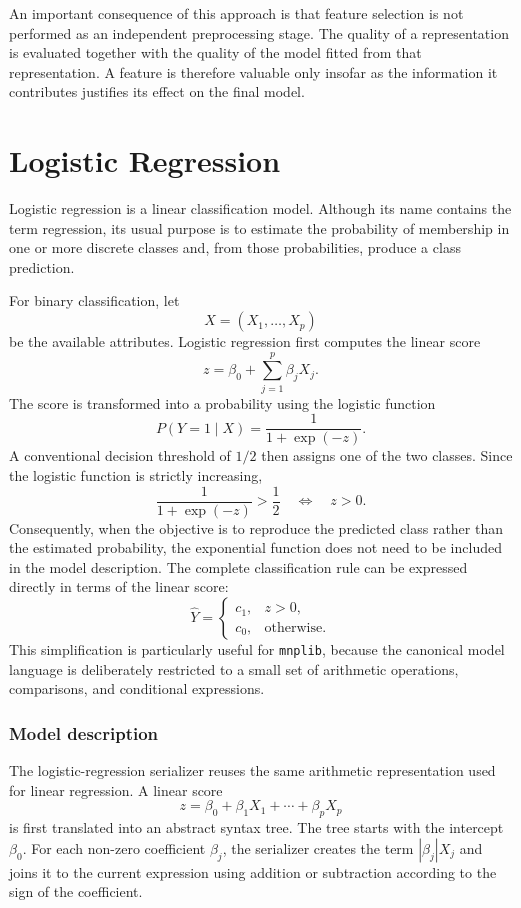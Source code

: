 An important consequence of this approach is that feature selection is not performed as an independent preprocessing stage. The quality of a representation is evaluated together with the quality of the model fitted from that representation. A feature is therefore valuable only insofar as the information it contributes justifies its effect on the final model.

%
%

\section{Logistic Regression}
\label{subsec:automl_logistic_regression}

Logistic regression is a linear classification model. Although its name contains the term regression, its usual purpose is to estimate the probability of membership in one or more discrete classes and, from those probabilities, produce a class prediction.

For binary classification, let
\[
X=(X_1,\ldots,X_p)
\]
be the available attributes. Logistic regression first computes the linear score
\[
z = \beta_0 + \sum_{j=1}^{p}\beta_j X_j.
\]
The score is transformed into a probability using the logistic function
\[
P(Y=1\mid X) = \frac{1}{1+\exp(-z)}.
\]
A conventional decision threshold of $1/2$ then assigns one of the two classes. Since the logistic function is strictly increasing,
\[
\frac{1}{1+\exp(-z)}>\frac{1}{2} \quad\Longleftrightarrow\quad z>0.
\]
Consequently, when the objective is to reproduce the predicted class rather than the estimated probability, the exponential function does not need to be included in the model description. The complete classification rule can be expressed directly in terms of the linear score:
\[
\widehat{Y} =
\begin{cases}
c_1, & z>0,\\
c_0, & \text{otherwise}.
\end{cases}
\]
This simplification is particularly useful for \texttt{mnplib}, because the canonical model language is deliberately restricted to a small set of arithmetic operations, comparisons, and conditional expressions.

\subsubsection{Model description}

The logistic-regression serializer reuses the same arithmetic representation used for linear regression. A linear score
\[
z = \beta_0 + \beta_1X_1 + \cdots + \beta_pX_p
\]
is first translated into an abstract syntax tree. The tree starts with the intercept $\beta_0$. For each non-zero coefficient $\beta_j$, the serializer creates the term $|\beta_j|X_j$ and joins it to the current expression using addition or subtraction according to the sign of the coefficient.

